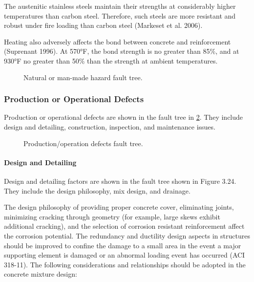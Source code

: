 The austenitic stainless steels maintain their strengths at considerably higher temperatures than carbon steel. Therefore, such steels are more resistant and robust under fire loading than carbon steel (Markeset et al. 2006). 

Heating also adversely affects the bond between concrete and reinforcement (Suprenant 1996). At 570°F, the bond strength is no greater than 85\%, and at 930°F no greater than 50\% than the strength at ambient temperatures.

\begin{figure}
  \caption{Natural or man-made hazard fault tree.}\label{fig:fault-tree-natural-manmade}
\end{figure}

\subsubsection{Production or Operational Defects}
Production or operational defects are shown in the fault tree in \cref{fig:fault-tree-production-operation}. They include design and detailing, construction, inspection, and maintenance issues.

\begin{figure}
  \caption{Production/operation defects fault tree.}\label{fig:fault-tree-production-operation}
\end{figure}

\paragraph{Design and Detailing}
Design and detailing factors are shown in the fault tree shown in Figure 3.24. They include the design philosophy, mix design, and drainage.

The design philosophy of providing proper concrete cover, eliminating joints, minimizing cracking through geometry (for example, large skews exhibit additional cracking), and the selection of corrosion resistant reinforcement affect the corrosion potential. The redundancy and ductility design aspects in structures should be improved to confine the damage to a small area in the event a major supporting element is damaged or an abnormal loading event has occurred (ACI 318-11). The following considerations and relationships should be adopted in the concrete mixture design:

